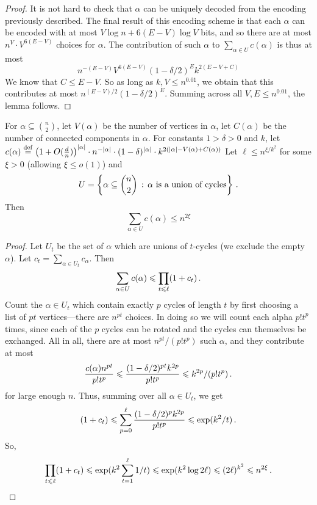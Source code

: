 \begin{proof}
  It is not hard to check that $\alpha$ can be uniquely decoded from the encoding previously described.
  The final result of this encoding scheme is that each $\alpha$ can be encoded with at most $V \log n + 6(E-V) \log V$ bits, and so there are at most $n^V \cdot V^{6(E-V)}$ choices for $\alpha$.
  The contribution of such $\alpha$ to $\sum_{\alpha \in U} c(\alpha)$ is thus at most
  \[
  n^{-(E-V)} V^{6(E-V)} (1 - \delta/2)^E k^{2(E-V+C)}
  \]
  We know that $C \leq E-V$.
  So as long as $k,V \leq n^{0.01}$, we obtain that this contributes at most $n^{(E-V)/2} (1 - \delta/2)^E$.
  Summing across all $V,E \leq n^{0.01}$, the lemma follows.
\end{proof}


\begin{lemma}\label{lem:lb-cycles}
  For $\alpha \subseteq \binom{n}{2}$, let $V(\alpha)$ be the number of vertices in $\alpha$, let $C(\alpha)$ be the number of connected components in $\alpha$.
  For constants $1 > \delta > 0$ and $k$, let $c(\alpha) \stackrel{\mathrm{def}}= \left(1 + O(\tfrac dn)\right)^{|\alpha|} \cdot n^{-|\alpha|} \cdot (1 - \delta)^{|\alpha|} \cdot k^{2(|\alpha| - V(\alpha) + C(\alpha))}$
  Let $\ell \leq n^{\xi/k^2}$ for some $\xi > 0$ (allowing $\xi \leq o(1)$) and
  \[
  U = \left \{ \alpha \subseteq \binom{n}{2} \, : \, \alpha \text{ is a union of cycles} \right \}\,.
  \]
  Then
  \[
    \sum_{\alpha \in U} c(\alpha) \leq  n^{2 \xi}
  \] 
\end{lemma}
\begin{proof}
  Let $U_t$ be the set of $\alpha$ which are unions of $t$-cycles (we exclude the empty $\alpha$).
  Let $c_t = \sum_{\alpha \in U_t} c_\alpha$.
  Then
  \[
   \sum_{\alpha \in U} c(\alpha) \leqslant  \prod_{t \leqslant \ell} (1 + c_t)\,.
  \]
  Count the $\alpha \in U_t$ which contain exactly $p$ cycles of length $t$ by first choosing a list of $pt$ vertices---there are $n^{pt}$ choices.
  In doing so we will count each alpha $p! t^p$ times, since each of the $p$ cycles can be rotated and the cycles can themselves be exchanged.
  All in all, there are at most $n^{pt}/(p! t^p)$ such $\alpha$, and they contribute at most
  \[
  \frac{c(\alpha) n^{pt}}{p! t^p} \leqslant \frac{ (1 - \delta/2)^{pt} k^{2p}}{p! t^p} \leqslant k^{2p}/(p! t^p)\,.
  \]
  for large enough $n$.
  Thus, summing over all $\alpha \in U_t$, we get
  \[
    (1 + c_t) \leqslant \sum_{p=0}^\ell \frac{ (1 - \delta/2)^p k^{2p}}{p! t^p} \leqslant \exp( k^2 /t)\,.
  \]
  So,
  \[
    \prod_{t \leqslant \ell} (1 + c_t) \leqslant \exp(k^2 \sum_{t=1}^\ell 1/t) \leqslant \exp(k^2 \log 2\ell) \leqslant (2\ell)^{k^2} \leqslant n^{2\xi}\,.
  \]
\end{proof}



